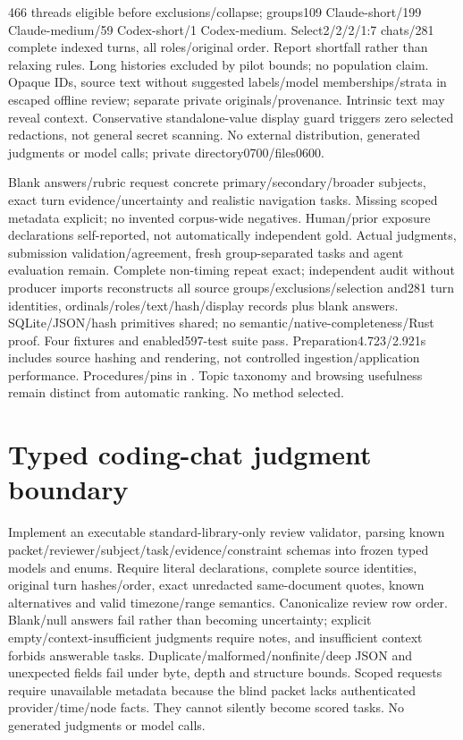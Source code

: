 \documentclass[11pt]{article}
\begin{document}
466 threads eligible before exclusions/collapse; groups109 Claude-short/199
Claude-medium/59 Codex-short/1 Codex-medium. Select2/2/2/1:7 chats/281 complete
indexed turns, all roles/original order. Report shortfall rather than relaxing
rules. Long histories excluded by pilot bounds; no population claim. Opaque IDs,
source text without suggested labels/model memberships/strata in escaped offline
review; separate private originals/provenance. Intrinsic text may reveal context.
Conservative standalone-value display guard triggers zero selected redactions,
not general secret scanning. No external distribution, generated judgments or
model calls; private directory0700/files0600.

Blank answers/rubric request concrete primary/secondary/broader subjects, exact
turn evidence/uncertainty and realistic navigation tasks. Missing scoped metadata
explicit; no invented corpus-wide negatives. Human/prior exposure declarations
self-reported, not automatically independent gold. Actual judgments, submission
validation/agreement, fresh group-separated tasks and agent evaluation remain.
Complete non-timing repeat exact; independent audit without producer imports
reconstructs all source groups/exclusions/selection and281 turn identities,
ordinals/roles/text/hash/display records plus blank answers. SQLite/JSON/hash
primitives shared; no semantic/native-completeness/Rust proof. Four fixtures and
enabled597-test suite pass. Preparation4.723/2.921s includes source hashing and
rendering, not controlled ingestion/application performance. Procedures/pins in
. Topic taxonomy and
browsing usefulness remain distinct from automatic ranking. No method selected.

\section{Typed coding-chat judgment boundary}
Implement an executable standard-library-only review validator, parsing known
packet/reviewer/subject/task/evidence/constraint schemas into frozen typed models
and enums. Require literal declarations, complete source identities, original
turn hashes/order, exact unredacted same-document quotes, known alternatives and
valid timezone/range semantics. Canonicalize review row order. Blank/null answers
fail rather than becoming uncertainty; explicit empty/context-insufficient
judgments require notes, and insufficient context forbids answerable tasks.
Duplicate/malformed/nonfinite/deep JSON and unexpected fields fail under byte,
depth and structure bounds. Scoped requests require unavailable metadata because
the blind packet lacks authenticated provider/time/node facts. They cannot
silently become scored tasks. No generated judgments or model calls.
\end{document}
